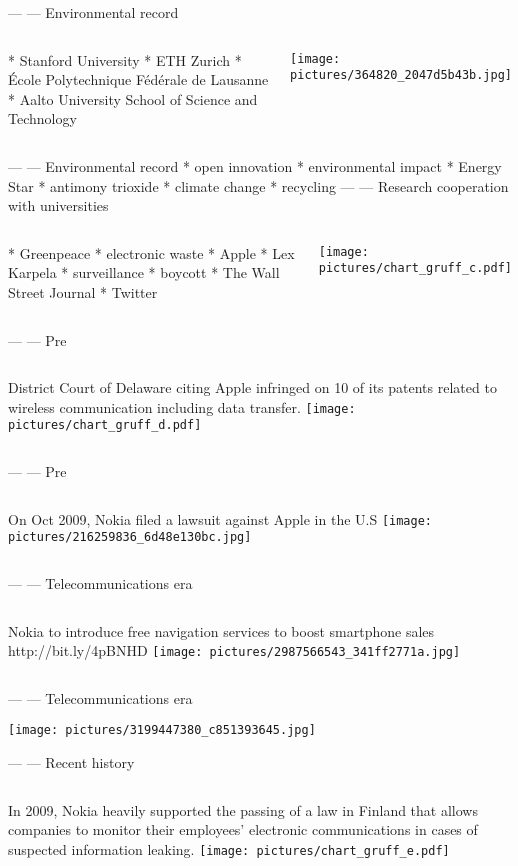 \documentclass{beamer}
\begin{document}
---
--- Environmental record
\begin{columns}
 * Stanford University
 * ETH Zurich
 * École Polytechnique Fédérale de Lausanne
 * Aalto University School of Science and Technology

\texttt{[image: pictures/364820\_2047d5b43b.jpg]}
\end{columns}
---
--- Environmental record
 * open innovation
 * environmental impact
 * Energy Star
 * antimony trioxide
 * climate change
 * recycling
---
--- Research cooperation with universities
\begin{columns}
 * Greenpeace
 * electronic waste
 * Apple
 * Lex Karpela
 * surveillance
 * boycott
 * The Wall Street Journal
 * Twitter

\texttt{[image: pictures/chart\_gruff\_c.pdf]}
\end{columns}
---
--- Pre
\begin{columns}
District Court of Delaware citing Apple infringed on 10 of its patents related to wireless communication including data transfer.
\texttt{[image: pictures/chart\_gruff\_d.pdf]}
\end{columns}
---
--- Pre
\begin{columns}
On Oct 2009, Nokia filed a lawsuit against Apple in the U.S
\texttt{[image: pictures/216259836\_6d48e130bc.jpg]}
\end{columns}
---
--- Telecommunications era
\begin{columns}
Nokia to introduce free navigation services to boost smartphone sales http://bit.ly/4pBNHD
\texttt{[image: pictures/2987566543\_341ff2771a.jpg]}
\end{columns}
---
--- Telecommunications era
\begin{center}
\texttt{[image: pictures/3199447380\_c851393645.jpg]}\end{center}
---
--- Recent history
\begin{columns}
In 2009, Nokia heavily supported the passing of a law in Finland that allows companies to monitor their employees’ electronic communications in cases of suspected information leaking.
\texttt{[image: pictures/chart\_gruff\_e.pdf]}
\end{columns}
\end{document}
